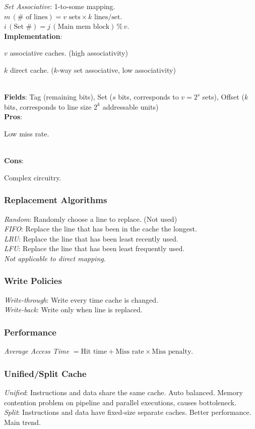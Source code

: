 \emph{Set Associative}: 1-to-some mapping.\\
$m \, (\#\text{ of lines}) = v \text{ sets} \times k \text{ lines/set}$.\\
$i \, (\text{Set \#}) = j \, (\text{Main mem block}) \, \%\, v$.\\
\textbf{Implementation}:
\begin{enuminline}
    \item $v$ associative caches. (high associativity)
    \item $k$ direct cache. ($k$-way set associative, low associativity)
\end{enuminline}\\
\textbf{Fields}: Tag (remaining bits), Set ($s$ bits, corresponds to $v=2^s$ sets), Offset ($k$ bits, corresponds to line size $2^k$ addressable units)\\
\textbf{Pros}:
\begin{enuminline}
    \item Low miss rate.
\end{enuminline}\\
\textbf{Cons}:
\begin{enuminline}
    \item Complex circuitry.
\end{enuminline}

\subsubsection*{Replacement Algorithms}
\emph{Random}: Randomly choose a line to replace. (Not used)\\
\emph{FIFO}: Replace the line that has been in the cache the longest.\\
\emph{LRU}: Replace the line that has been least recently used.\\
\emph{LFU}: Replace the line that has been least frequently used.\\
\textit{Not applicable to direct mapping}.

\subsubsection*{Write Policies}
\emph{Write-through}: Write every time cache is changed.\\
\emph{Write-back}: Write only when line is replaced.

\subsubsection*{Performance}
\emph{Average Access Time} $= \text{Hit time} + \text{Miss rate} \times \text{Miss penalty}$.

\subsubsection*{Unified/Split Cache}
\emph{Unified}: Instructions and data share the same cache. Auto balanced. Memory contention problem on pipeline and parallel executions, causes bottoleneck.\\
\emph{Split}: Instructions and data have fixed-size separate caches. Better performance. Main trend.